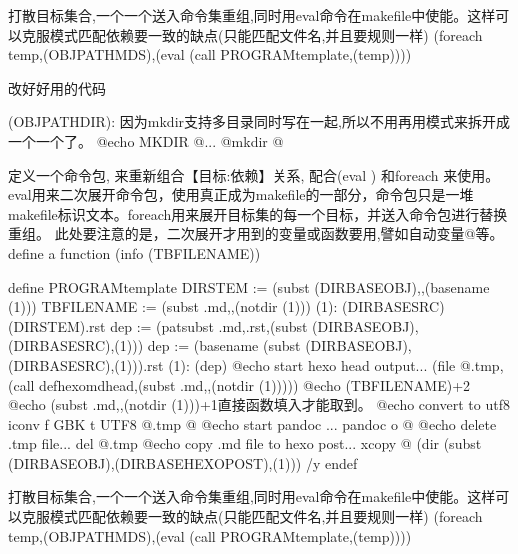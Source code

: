 \documentclass[letterpaper,12pt,english]{sphinxmanual}
\begin{document}
\begin{sphinxVerbatim}[commandchars=\\\{\}]
\PYGZsh{} 打散目标集合,一个一个送入命令集重组,同时用eval命令在makefile中使能。这样可以克服模式匹配依赖要一致的缺点(\PYGZpc{}只能匹配文件名,并且要规则一样)
\PYGZdl{}(foreach temp,\PYGZdl{}(OBJ\PYGZus{}PATH\PYGZus{}MDS),\PYGZdl{}(eval \PYGZdl{}(call PROGRAM\PYGZus{}template,\PYGZdl{}(temp))))
\end{sphinxVerbatim}

改好好用的代码

\begin{sphinxVerbatim}[commandchars=\\\{\}]
\PYGZdl{}(OBJ\PYGZus{}PATH\PYGZus{}DIR):
\PYGZsh{}因为mkdir支持多目录同时写在一起,所以不用再用模式来拆开成一个一个了。
 @echo \PYGZdq{}   MKDIR \PYGZdl{}@...\PYGZdq{}
 @mkdir \PYGZdl{}@

\PYGZsh{}\PYGZsh{}定义一个命令包, 来重新组合【目标:依赖】关系, 配合\PYGZdl{}(eval ) 和foreach 来使用。eval用来二次展开命令包，使用真正成为makefile的一部分，命令包只是一堆makefile标识文本。foreach用来展开目标集的每一个目标，并送入命令包进行替换重组。
\PYGZsh{}\PYGZsh{}此处要注意的是，二次展开才用到的变量或函数要用\PYGZdl{}\PYGZdl{},譬如自动变量\PYGZdl{}@等。
\PYGZsh{}\PYGZsh{}define a function
\PYGZsh{}\PYGZdl{}(info \PYGZdl{}(TBFILENAME))

define PROGRAM\PYGZus{}template
DIR\PYGZus{}STEM := \PYGZdl{}(subst \PYGZdl{}(DIR\PYGZus{}BASE\PYGZus{}OBJ),,\PYGZdl{}(basename \PYGZdl{}(1)))
\PYGZsh{}TBFILENAME := \PYGZdl{}(subst .md,,\PYGZdl{}(notdir \PYGZdl{}(1)))
\PYGZsh{}\PYGZdl{}(1): \PYGZdl{}(DIR\PYGZus{}BASE\PYGZus{}SRC)\PYGZdl{}\PYGZdl{}(DIR\PYGZus{}STEM).rst
\PYGZsh{}dep := \PYGZdl{}(patsubst \PYGZpc{}.md,\PYGZpc{}.rst,\PYGZdl{}(subst \PYGZdl{}(DIR\PYGZus{}BASE\PYGZus{}OBJ),\PYGZdl{}(DIR\PYGZus{}BASE\PYGZus{}SRC),\PYGZdl{}(1)))
dep := \PYGZdl{}(basename \PYGZdl{}(subst \PYGZdl{}(DIR\PYGZus{}BASE\PYGZus{}OBJ),\PYGZdl{}(DIR\PYGZus{}BASE\PYGZus{}SRC),\PYGZdl{}(1))).rst
\PYGZdl{}(1): \PYGZdl{}\PYGZdl{}(dep)
 @echo start hexo head output...
 \PYGZdl{}\PYGZdl{}(file \PYGZgt{}\PYGZdl{}\PYGZdl{}@.tmp,\PYGZdl{}\PYGZdl{}(call def\PYGZus{}hexo\PYGZus{}md\PYGZus{}head,\PYGZdl{}(subst .md,,\PYGZdl{}(notdir \PYGZdl{}(1)))))
\PYGZsh{}  @echo \PYGZdl{}\PYGZdl{}(TBFILENAME)+2
\PYGZsh{}  @echo \PYGZdl{}(subst .md,,\PYGZdl{}(notdir \PYGZdl{}(1)))+1\PYGZsh{}直接函数填入才能取到。
 @echo convert to utf8
 iconv \PYGZhy{}f GBK \PYGZhy{}t UTF\PYGZhy{}8 \PYGZdl{}\PYGZdl{}@.tmp \PYGZgt{}\PYGZdl{}\PYGZdl{}@
 @echo start pandoc ...
 pandoc \PYGZdl{}\PYGZdl{}\PYGZlt{} \PYGZhy{}o \PYGZhy{} \PYGZgt{}\PYGZgt{}\PYGZdl{}\PYGZdl{}@
 @echo delete .tmp file...
 del \PYGZdl{}\PYGZdl{}@.tmp
 @echo copy .md file to hexo post...
 xcopy \PYGZdl{}\PYGZdl{}@ \PYGZdl{}(dir \PYGZdl{}(subst \PYGZdl{}(DIR\PYGZus{}BASE\PYGZus{}OBJ),\PYGZdl{}(DIR\PYGZus{}BASE\PYGZus{}HEXO\PYGZus{}POST),\PYGZdl{}(1))) /y
endef

\PYGZsh{} 打散目标集合,一个一个送入命令集重组,同时用eval命令在makefile中使能。这样可以克服模式匹配依赖要一致的缺点(\PYGZpc{}只能匹配文件名,并且要规则一样)
\PYGZdl{}(foreach temp,\PYGZdl{}(OBJ\PYGZus{}PATH\PYGZus{}MDS),\PYGZdl{}(eval \PYGZdl{}(call PROGRAM\PYGZus{}template,\PYGZdl{}(temp))))
\end{sphinxVerbatim}
\end{document}

